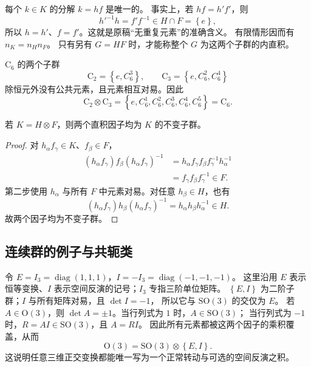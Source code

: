 每个 $k\in K$ 的分解 $k=hf$ 是唯一的。
事实上，若 $hf=h'f'$，则
\begin{equation}
h'^{-1}h=f'f^{-1}\in H\cap F=\left\{e\right\},
\end{equation}
所以 $h=h'$、$f=f'$。这就是原稿“无重复元素”的准确含义。
有限情形因而有 $n_K=n_Hn_F$。
只有另有 $G=HF$ 时，才能称整个 $G$ 为这两个子群的内直积。

\begin{example}
$\mathrm{C}_6$ 的两个子群
\begin{equation}
\mathrm{C}_2=\left\{e,C_6^3\right\},\qquad \mathrm{C}_3=\left\{e,C_6^2,C_6^4\right\}
\end{equation}
除恒元外没有公共元素，且元素相互对易。因此
\begin{equation}
\mathrm{C}_2\otimes\mathrm{C}_3
=\left\{e,C_6^1,C_6^2,C_6^3,C_6^4,C_6^5\right\}=\mathrm{C}_6.
\end{equation}
\end{example}

\begin{proposition}
若 $K=H\otimes F$，则两个直积因子均为 $K$ 的不变子群。
\end{proposition}
\begin{proof}
对 $h_\alpha f_\gamma\in K$、$f_\beta\in F$，
\begin{align}
\left(h_\alpha f_\gamma\right)f_\beta\left(h_\alpha f_\gamma\right)^{-1}
&=h_\alpha f_\gamma f_\beta f_\gamma^{-1}h_\alpha^{-1}\\
&=f_\gamma f_\beta f_\gamma^{-1}\in F.
\end{align}
第二步使用 $h_\alpha$ 与所有 $F$ 中元素对易。对任意 $h_\beta\in H$，也有
\begin{equation}
\left(h_\alpha f_\gamma\right)h_\beta\left(h_\alpha f_\gamma\right)^{-1}
=h_\alpha h_\beta h_\alpha^{-1}\in H.
\end{equation}
故两个因子均为不变子群。
\end{proof}

\subsection{连续群的例子与共轭类}
\begin{example}
令 $E=I_3=\operatorname{diag}\left(1,1,1\right)$，$I=-I_3=\operatorname{diag}\left(-1,-1,-1\right)$。
这里沿用 $E$ 表示恒等变换、$I$ 表示空间反演的记号；$I_3$ 专指三阶单位矩阵。
$\left\{E,I\right\}$ 为二阶子群；$I$ 与所有矩阵对易，且 $\det I=-1$，
所以它与 $\mathrm{SO}\left(3\right)$ 的交仅为 $E$。
若 $A\in\mathrm{O}\left(3\right)$，则 $\det A=\pm1$。当行列式为 $1$ 时，$A\in\mathrm{SO}\left(3\right)$；
当行列式为 $-1$ 时，$R=AI\in\mathrm{SO}\left(3\right)$，且 $A=RI$。
因此所有元素都被这两个因子的乘积覆盖，从而
\begin{equation}
\mathrm{O}\left(3\right)=\mathrm{SO}\left(3\right)\otimes\left\{E,I\right\}.
\end{equation}
这说明任意三维正交变换都能唯一写为一个正常转动与可选的空间反演之积。
\end{example}

